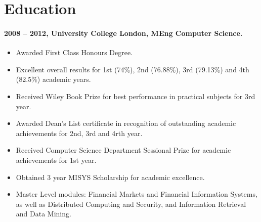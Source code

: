 \documentclass[11pt, a4paper]{article}
\newlength{\wideitemsep}
\let\olditem\item
\renewcommand{\item}{\setlength{\itemsep}{\wideitemsep}\olditem}
\begin{document}
\section*{Education}
\paragraph{2008 – 2012, University College London, MEng Computer Science.}
\begin{itemize}
\item Awarded First Class Honours Degree.
\item Excellent overall results for 1st (74\%), 2nd (76.88\%), 3rd (79.13\%) and 4th (82.5\%) academic years.
\item Received Wiley Book Prize for best performance in practical subjects for 3rd year.
\item Awarded Dean's List certificate in recognition of outstanding academic achievements for 2nd, 3rd and 4rth year.
\item Received Computer Science Department Sessional Prize for academic achievements for 1st year.
\item Obtained 3 year MISYS Scholarship for academic excellence.
\item Master Level modules: Financial Markets and Financial Information Systems, as well as Distributed Computing and Security, and Information Retrieval and Data Mining.
\end{itemize}
\end{document}
